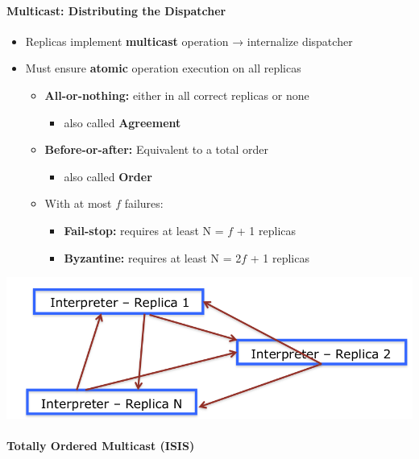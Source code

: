 \paragraph{Multicast: Distributing the Dispatcher}
\begin{itemize}
\item Replicas implement \textbf{multicast} operation
  → internalize dispatcher
\item Must ensure \textbf{atomic} operation execution on all
  replicas
  \begin{itemize}
  \item \textbf{All-or-nothing:} either in all correct replicas or
    none
    \begin{itemize}
    \item also called \textbf{Agreement}
    \end{itemize}

  \item \textbf{Before-or-after:} Equivalent to a total order
    \begin{itemize}
    \item also called \textbf{Order}
    \end{itemize}

  \item With at most $f$ failures:
    \begin{itemize}
    \item  \textbf{Fail-stop:} requires at least N = $f$ + 1 replicas
    \item \textbf{Byzantine:} requires at least N = 2$f$ + 1 replicas
    \end{itemize}
  \end{itemize}
\end{itemize}

\includegraphics[scale=0.15]{graphics/multicast.png}

\paragraph{Totally Ordered Multicast (ISIS)}

